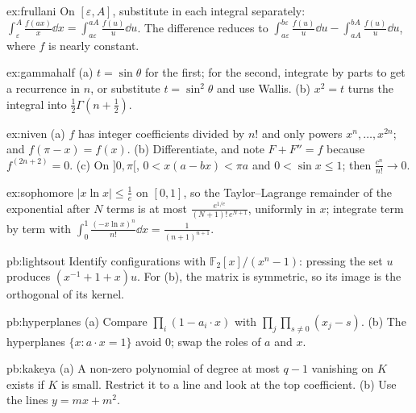 \begin{hint}{ex:frullani}
On $[\varepsilon,A]$, substitute in each integral separately: $\int_\varepsilon^A\frac{f(ax)}x\dd x=\int_{a\varepsilon}^{aA}\frac{f(u)}u\dd u$. The difference reduces to $\int_{a\varepsilon}^{b\varepsilon}\frac{f(u)}u\dd u-\int_{aA}^{bA}\frac{f(u)}u\dd u$, where $f$ is nearly constant.
\end{hint}
\begin{hint}{ex:gammahalf}
(a) $t=\sin\theta$ for the first; for the second, integrate by parts to get a recurrence in $n$, or substitute $t=\sin^2\theta$ and use Wallis. (b) $x^2=t$ turns the integral into $\frac12\Gamma\left(n+\frac12\right)$.
\end{hint}
\begin{hint}{ex:niven}
(a) $f$ has integer coefficients divided by $n!$ and only powers $x^n,\dots,x^{2n}$; and $f(\pi-x)=f(x)$. (b) Differentiate, and note $F+F''=f$ because $f^{(2n+2)}=0$. (c) On $]0,\pi[$, $0<x(a-bx)<\pi a$ and $0<\sin x\le1$; then $\frac{c^n}{n!}\to0$.
\end{hint}
\begin{hint}{ex:sophomore}
$|x\ln x|\le\frac1e$ on $[0,1]$, so the Taylor--Lagrange remainder of the exponential after $N$ terms is at most $\frac{e^{1/e}}{(N+1)!\,e^{N+1}}$, uniformly in $x$; integrate term by term with $\int_0^1\frac{(-x\ln x)^n}{n!}\dd x=\frac1{(n+1)^{n+1}}$.
\end{hint}

\begin{hint}{pb:lightsout}
Identify configurations with $\mathbb F_2[x]/(x^n-1)$: pressing the set $u$ produces $(x^{-1}+1+x)u$. For (b), the matrix is
symmetric, so its image is the orthogonal of its kernel.
\end{hint}

\begin{hint}{pb:hyperplanes}
(a) Compare $\prod_i(1-a_i\cdot x)$ with $\prod_j\prod_{s\ne0}(x_j-s)$. (b) The hyperplanes $\{x:a\cdot x=1\}$ avoid $0$; swap the
roles of $a$ and $x$.
\end{hint}

\begin{hint}{pb:kakeya}
(a) A non-zero polynomial of degree at most $q-1$ vanishing on $K$ exists if $K$ is small. Restrict it to a line and look at the
top coefficient. (b) Use the lines $y=mx+m^2$.
\end{hint}

